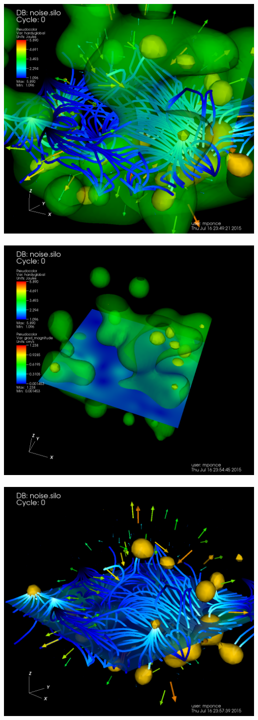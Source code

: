 \begin{frame}
\vspace{5mm}
\begin{columns}
\begin{column}{12cm}
	\centering
	\includegraphics[width=.33\columnwidth]{figs/visit-pract/VisIt_mix01}
	~
	\includegraphics[width=.33\columnwidth]{figs/visit-pract/VisIt_mix02}
	~
	\includegraphics[width=.33\columnwidth]{figs/visit-pract/VisIt_mix03}
\end{column}
\end{columns}
\end{frame}



